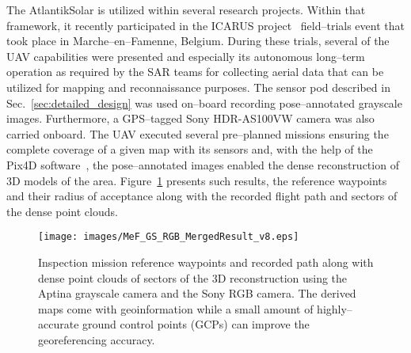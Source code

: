 The AtlantikSolar is utilized within several research projects. Within that framework, it recently participated in the ICARUS project~\cite{ICARUSsite} field--trials event that took place in Marche--en--Famenne, Belgium. During these trials, several of the UAV capabilities were presented and especially its autonomous long--term operation as required by the SAR teams for collecting aerial data that can be utilized for mapping and reconnaissance purposes. The sensor pod described in Sec.~\ref{sec:detailed_design} was used on--board recording pose--annotated grayscale images. Furthermore, a GPS--tagged Sony HDR-AS100VW camera was also carried onboard. The UAV executed several pre--planned missions ensuring the complete coverage of a given map with its sensors and, with the help of the Pix4D software~\cite{Pix4Dsite}, the pose--annotated images enabled the dense reconstruction of $3\textrm{D}$ models of the area. Figure~\ref{fig:mef_icarus_reconstruction} presents such results, the reference waypoints and their radius of acceptance along with the recorded flight path and sectors of the dense point clouds. 


%
\begin{figure}[htbp]
\begin{center}
  \texttt{[image: images/MeF\_GS\_RGB\_MergedResult\_v8.eps]} %
\end{center}
\caption{Inspection mission reference waypoints and recorded path along with dense point clouds of sectors of the $3\textrm{D}$ reconstruction using the Aptina grayscale camera and the Sony RGB camera. The derived maps come with geoinformation while a small amount of highly--accurate ground control points (GCPs) can improve the georeferencing accuracy.  }
\label{fig:mef_icarus_reconstruction}
\end{figure}
%
